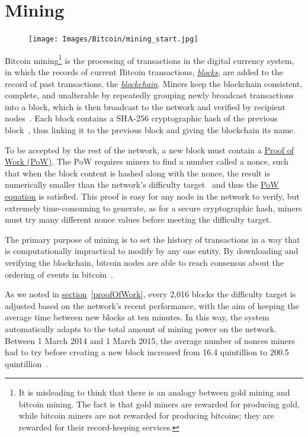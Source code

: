 \section{Mining}
\setlength{\intextsep}{0pt}
\begin{figure}
\centering
\texttt{[image: Images/Bitcoin/mining\_start.jpg]}
\end{figure}
Bitcoin mining\footnote{It is misleading to think that there is an analogy between gold mining and bitcoin mining. The fact is that gold miners are rewarded for producing gold, while bitcoin miners are not rewarded for producing bitcoins; they are rewarded for their record-keeping services.} is the processing of transactions in the digital currency system, in which the records of current Bitcoin transactions, \hyperref[sec:blocks]{\emph{blocks}}, are added to the record of past transactions, the \hyperref[sec:blockchain]{\emph{blockchain}}. Miners keep the blockchain consistent, complete, and unalterable by repeatedly grouping newly broadcast transactions into a block, which is then broadcast to the network and verified by recipient nodes~\cite{economist}. Each block contains a SHA-256 cryptographic hash of the previous block~\cite{economist}, thus linking it to the previous block and giving the blockchain its name.

To be accepted by the rest of the network, a new block must contain a \hyperref[proofOfWork]{Proof of Work (PoW)}. The PoW requires miners to find a number called a nonce, such that when the block content is hashed along with the nonce, the result is numerically smaller than the network's difficulty target~\cite{Nakamoto_bitcoin:a} and thus the \hyperref[eq:PoW]{PoW equation} is satisfied. This proof is easy for any node in the network to verify, but extremely time-consuming to generate, as for a secure cryptographic hash, miners must try many different nonce values before meeting the difficulty target.

The primary purpose of mining is to set the history of transactions in a way that is computationally impractical to modify by any one entity. By downloading and verifying the blockchain, bitcoin nodes are able to reach consensus about the ordering of events in bitcoin~\cite{wiki}.

As we noted in \hyperref[proofOfWork]{section}~\ref{proofOfWork}, every 2,016 blocks the difficulty target is adjusted based on the network's recent performance, with the aim of keeping the average time between new blocks at ten minutes. In this way, the system automatically adapts to the total amount of mining power on the network. Between 1 March 2014 and 1 March 2015, the average number of nonces miners had to try before creating a new block increased from 16.4 quintillion to 200.5 quintillion~\cite{difficulty_history}.


